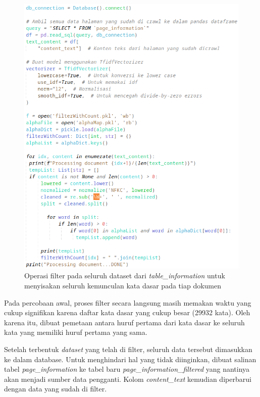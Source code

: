 \begin{figure}[H]
  \centering{}
	\includegraphics[width=\textwidth]{gambar/implementasi_filterkatadasar.png}
  \caption{Operasi filter pada seluruh dataset dari \textit{table\_information} 
  untuk menyisakan seluruh kemunculan kata dasar pada tiap dokumen}
\end{figure}

Pada percobaan awal, proses filter secara langsung masih memakan waktu yang 
cukup signifikan karena daftar kata dasar yang cukup besar (29932 kata). Oleh 
karena itu, dibuat pemetaan antara huruf pertama dari kata dasar ke seluruh kata 
yang memiliki huruf pertama yang sama.

Setelah terbentuk \textit{dataset} yang telah di filter, seluruh data tersebut 
dimasukkan ke dalam database. Untuk menghindari hal yang tidak diinginkan, 
dibuat salinan tabel \textit{page\_information} ke tabel baru
\textit{page\_information\_filtered} yang nantinya akan menjadi sumber data 
pengganti. Kolom \textit{content\_text} kemudian diperbarui dengan data yang 
sudah di filter.

